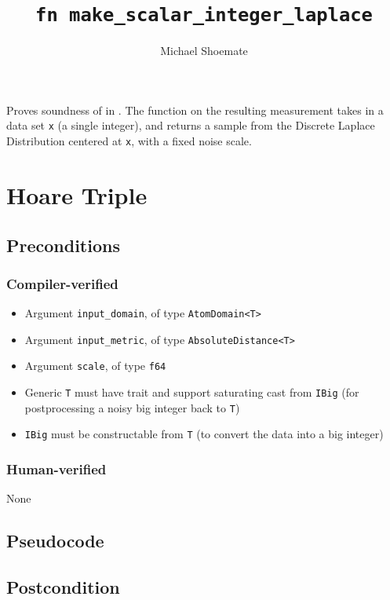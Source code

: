 \documentclass{article}
\title{\texttt{fn make\_scalar\_integer\_laplace}}
\author{Michael Shoemate}
\begin{document}
\maketitle

Proves soundness of  in .
The function on the resulting measurement takes in a data set \texttt{x} (a single integer), 
and returns a sample from the Discrete Laplace Distribution centered at \texttt{x}, with a fixed noise scale.

\section{Hoare Triple}

\subsection*{Preconditions}
\subsubsection*{Compiler-verified}
\begin{itemize}
    \item Argument \texttt{input\_domain}, of type \texttt{AtomDomain<T>}
    \item Argument \texttt{input\_metric}, of type \texttt{AbsoluteDistance<T>}
    \item Argument \texttt{scale}, of type \texttt{f64}
    \item Generic \texttt{T} must have trait  and support saturating cast from \texttt{IBig} (for postprocessing a noisy big integer back to \texttt{T})
    \item \texttt{IBig} must be constructable from \texttt{T} (to convert the data into a big integer)
\end{itemize}

\subsubsection*{Human-verified}
None

\subsection*{Pseudocode}


\subsection*{Postcondition}
\end{document}
